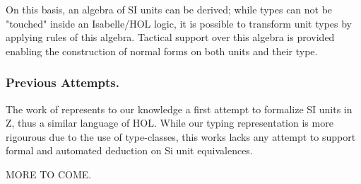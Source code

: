 \documentclass[11pt,a4paper]{book}
\begin{document}
On this basis, an algebra of SI units can be derived; while types can not be "touched" inside
an Isabelle/HOL logic, it is possible to transform unit types by applying rules of this algebra.
Tactical support over this algebra is provided enabling the construction of normal forms on 
both units and their type.  

\subsubsection{Previous Attempts.} The work of \cite{HayesBrendan95} represents to our knowledge a
first attempt to formalize SI units in Z, thus a similar language of HOL. While our typing
representation is more rigourous due to the use of type-classes, this works lacks any attempt
to support formal and automated deduction on Si unit equivalences.

MORE TO COME.





\end{document}
